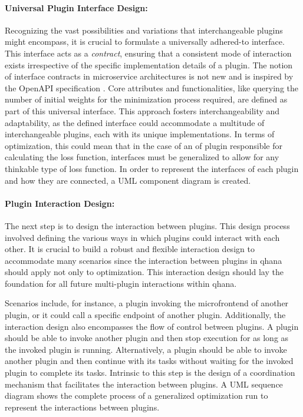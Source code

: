 \documentclass[
  a4paper,  %
  twoside,  %
  bibliography=totoc,
  headsepline,
  cleardoublepage=empty,
  parskip=half,
  draft=false
]{scrbook}
\begin{document}
\paragraph{Universal Plugin Interface Design:}
Recognizing the vast possibilities and variations that interchangeable plugins might encompass, it is crucial to formulate a universally adhered-to interface.
This interface acts as a \emph{contract}, ensuring that a consistent mode of interaction exists irrespective of the specific implementation details of a plugin.
The notion of interface contracts in microservice architectures is not new and is inspired by the OpenAPI specification \cite{Miller}.
Core attributes and functionalities, like querying the number of initial weights for the minimization process required, are defined as part of this universal interface.
This approach fosters interchangeability and adaptability, as the defined interface could accommodate a multitude of interchangeable plugins, each with its unique implementations.
In terms of optimization, this could mean that in the case of an \gls{of} plugin responsible for calculating the loss function, interfaces must be generalized to allow for any thinkable type of loss function.
In order to represent the interfaces of each plugin and how they are connected, a UML component diagram is created.

\paragraph{Plugin Interaction Design:}
The next step is to design the interaction between plugins.
This design process involved defining the various ways in which plugins could interact with each other.
It is crucial to build a robust and flexible interaction design to accommodate many scenarios since the interaction between plugins in \gls{qhana} should apply not only to optimization.
This interaction design should lay the foundation for all future multi-plugin interactions within \gls{qhana}.

Scenarios include, for instance, a plugin invoking the microfrontend of another plugin, or it could call a specific endpoint of another plugin.
Additionally, the interaction design also encompasses the flow of control between plugins.
A plugin should be able to invoke another plugin and then stop execution for as long as the invoked plugin is running.
Alternatively, a plugin should be able to invoke another plugin and then continue with its tasks without waiting for the invoked plugin to complete its tasks.
Intrinsic to this step is the design of a coordination mechanism that facilitates the interaction between plugins.
A UML sequence diagram shows the complete process of a generalized optimization run to represent the interactions between plugins.
\end{document}
